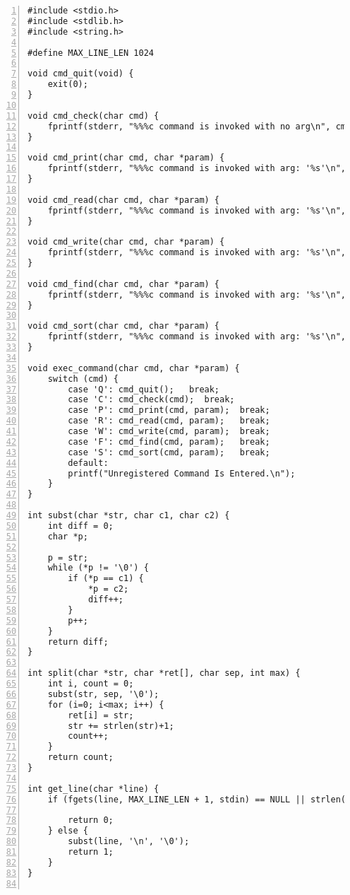\documentclass[autodetect-engine,dvi=dvipdfmx,ja=standard,
               a4j,11pt]{bxjsarticle}
\begin{document}
\begin{Verbatim}[numbers=left, xleftmargin=10mm, numbersep=6pt,
    fontsize=\small, baselinestretch=0.8]
#include <stdio.h>
#include <stdlib.h>
#include <string.h>

#define MAX_LINE_LEN 1024

void cmd_quit(void) {
    exit(0);
}

void cmd_check(char cmd) {
    fprintf(stderr, "%%%c command is invoked with no arg\n", cmd);
}

void cmd_print(char cmd, char *param) {
    fprintf(stderr, "%%%c command is invoked with arg: '%s'\n", cmd, param);
}

void cmd_read(char cmd, char *param) {
    fprintf(stderr, "%%%c command is invoked with arg: '%s'\n", cmd, param);
}

void cmd_write(char cmd, char *param) {
    fprintf(stderr, "%%%c command is invoked with arg: '%s'\n", cmd, param);
}

void cmd_find(char cmd, char *param) {
    fprintf(stderr, "%%%c command is invoked with arg: '%s'\n", cmd, param);
}

void cmd_sort(char cmd, char *param) {
    fprintf(stderr, "%%%c command is invoked with arg: '%s'\n", cmd, param);
}

void exec_command(char cmd, char *param) {
    switch (cmd) {
        case 'Q': cmd_quit();   break;
        case 'C': cmd_check(cmd);  break;
        case 'P': cmd_print(cmd, param);  break;
        case 'R': cmd_read(cmd, param);   break;
        case 'W': cmd_write(cmd, param);  break;
        case 'F': cmd_find(cmd, param);   break;
        case 'S': cmd_sort(cmd, param);   break;
        default:
        printf("Unregistered Command Is Entered.\n");
    }
}

int subst(char *str, char c1, char c2) {
    int diff = 0;
    char *p;

    p = str;
    while (*p != '\0') {
        if (*p == c1) {
            *p = c2;
            diff++;
        }
        p++;
    }
    return diff;
}

int split(char *str, char *ret[], char sep, int max) {
    int i, count = 0;
    subst(str, sep, '\0');
    for (i=0; i<max; i++) {
        ret[i] = str;
        str += strlen(str)+1;
        count++;
    }
    return count;
}

int get_line(char *line) {
    if (fgets(line, MAX_LINE_LEN + 1, stdin) == NULL || strlen(line) > MAX_LINE_LEN ||
                                                                        *line == '\n') {
        return 0;
    } else {
        subst(line, '\n', '\0');
        return 1;
    }
}


\end{Verbatim}
\end{document}
